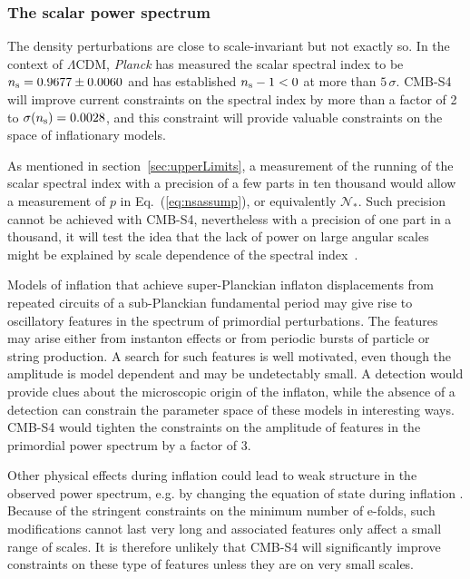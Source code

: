 \subsubsection{The scalar power spectrum}
The density perturbations are close to scale-invariant but not exactly so. In the context of $\Lambda$CDM, {\it Planck\/} has measured the scalar spectral index to be $n_{\rm s}=0.9677\pm0.0060$ and has established $n_{\rm s}-1<0$ at more than $5\,\sigma$. CMB-S4 will improve current constraints on the spectral index by more than a factor of 2 to $\sigma(n_{\rm s})=0.0028$, and this constraint will provide valuable constraints on the space of inflationary models. 

As mentioned in section~\ref{sec:upperLimits}, a measurement of the running of the scalar spectral index with a precision of a few parts in ten thousand would allow a measurement of $p$ in Eq.~(\ref{eq:nsassump}), or equivalently $\mathcal{N}_\ast$. Such precision cannot be achieved with CMB-S4, nevertheless with a precision of one part in a thousand, it will test the idea that the lack of power on large angular scales might be explained by scale dependence of the spectral index~\cite{Meerburg:2014bpa}.  

Models of inflation that achieve super-Planckian inflaton displacements from repeated circuits of a sub-Planckian fundamental period may give rise to oscillatory features in the spectrum of primordial perturbations. The features may arise either from instanton effects or from periodic bursts of particle or string production. A search for such features is well motivated, even though the amplitude is model dependent and may be undetectably small. A detection would provide clues about the microscopic origin of the inflaton, while the absence of a detection can constrain the parameter space of these models in interesting ways. CMB-S4 would tighten the constraints on the amplitude of features in the primordial power spectrum by a factor of 3. 

Other physical effects during inflation could lead to weak structure in the observed power spectrum, e.g. by changing the equation of state during inflation \cite{Achucarro:2014msa}. Because of the stringent constraints on the minimum number of e-folds, such modifications cannot last very long and associated features only affect a small range of scales. It is therefore unlikely that CMB-S4 will significantly improve constraints on these type of features unless they are on very small scales. 

